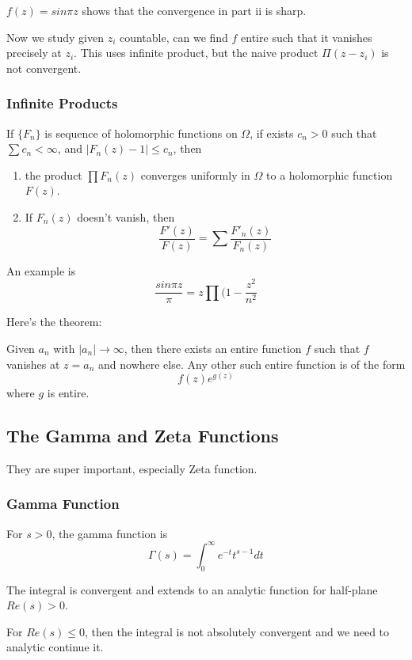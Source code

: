 \documentclass[main.tex]{subfiles}
\begin{document}
$f(z) = sin \pi z$ shows that the convergence in part ii is sharp. 

Now we study given $z_i$ countable, can we find $f$ entire such that it vanishes precisely at $z_i$. This uses infinite product, but the naive product $\Pi(z - z_i)$ is not convergent.

\subsubsection{Infinite Products}

\begin{proposition}
If $\{F_n\}$ is sequence of holomorphic functions on $\Omega$, if exists $c_n > 0$ such that 
$\sum c_n < \infty$, and $|F_n(z) - 1| \leq c_n$, then 
\begin{enumerate}
    \item the product $\prod F_n(z)$ converges uniformly in $\Omega$ to a holomorphic function $F(z)$.
    \item If $F_n(z)$ doesn't vanish, then
    $$
    \frac{F'(z)}{F(z)} = \sum     \frac{F'_n(z)}{F_n(z)}
    $$
\end{enumerate}
\end{proposition}

An example is 
$$
\frac{sin \pi z}{\pi } = z \prod (1 - \frac{z^2}{n^2}
$$

Here's the theorem:
\begin{theorem}
Given $a_n$ with $|a_n| \rightarrow \infty$, then there exists an entire function $f$ such that $f$ vanishes at $z = a_n$ and nowhere else. Any other such entire function is of the form 
$$
f(z) e^{g(z)}
$$
where $g$ is entire.
\end{theorem}


\subsection{The Gamma and Zeta Functions}
They are super important, especially Zeta function.

\subsubsection{Gamma Function}
For $s > 0$, the gamma function is 
$$
\Gamma(s) = \int_0 ^{\infty} e^{-t} t^{s-1} dt
$$

The integral is convergent and extends to an analytic function for half-plane $Re(s) > 0$.

For $Re(s) \leq 0$, then the integral is not absolutely convergent and we need to analytic continue it.
\end{document}
